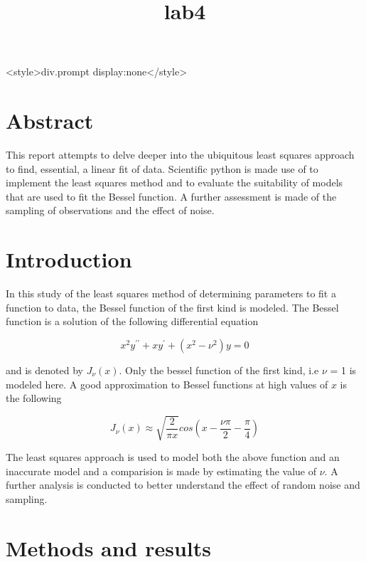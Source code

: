 \documentclass[11pt]{article}
\title{lab4}
\begin{document}
    
    
    \maketitle
    
    

    <style>div.prompt {display:none}</style>
    \section{Abstract}\label{abstract}

This report attempts to delve deeper into the ubiquitous least squares
approach to find, essential, a linear fit of data. Scientific python is
made use of to implement the least squares method and to evaluate the
suitability of models that are used to fit the Bessel function. A
further assessment is made of the sampling of observations and the
effect of noise.

    \section{Introduction}\label{introduction}

In this study of the least squares method of determining parameters to
fit a function to data, the Bessel function of the first kind is
modeled. The Bessel function is a solution of the following differential
equation

\begin{equation}
x^2y^{\prime\prime} + xy^{\prime} + (x^2- \nu^2)y = 0
\end{equation}

and is denoted by $J_\nu(x)$. Only the bessel function of the first
kind, i.e $\nu$ = 1 is modeled here. A good approximation to Bessel
functions at high values of $x$ is the following

\begin{equation}
J_\nu(x) \approx \sqrt{\frac{2}{\pi x}}cos\left(x-\frac{\nu\pi}{2}- \frac{\pi}{4}\right)
\end{equation}

The least squares approach is used to model both the above function and
an inaccurate model and a comparision is made by estimating the value of
$\nu$. A further analysis is conducted to better understand the effect
of random noise and sampling.

    \section{Methods and results}\label{methods-and-results}
\end{document}
